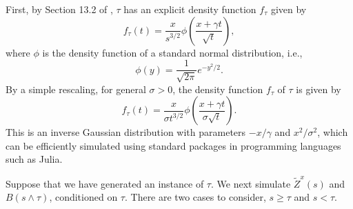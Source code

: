 \documentclass[11pt]{article}
\theoremstyle{definition}
\theoremstyle{plain}
\begin{document}
\begin{appendices}
First, by Section 13.2 of \cite{Steele2001}, $\tau$ has an explicit density function $f_\tau$ given by
\begin{equation}
f_\tau (t) = \frac{x}{s^{3/2}} \phi\left(\frac{x+\gamma t}{\sqrt{t}}\right),
\end{equation}
where $\phi$ is the density function of a standard normal distribution, i.e., 
\begin{equation}
\phi(y) = \frac{1}{\sqrt{2\pi}} e^{-y^2/2}.
\end{equation}
By a simple rescaling, for general $\sigma > 0$, the density function $f_\tau$ 
of $\tau$ is given by 
\begin{equation}
f_\tau (t) = \frac{x}{\sigma t^{3/2}} \phi\left(\frac{x+\gamma t}{\sigma\sqrt{t}}\right).
\end{equation}
This is an inverse Gaussian distribution with parameters $-x/\gamma$ and $x^2/\sigma^2$, 
which can be efficiently simulated using standard packages in programming languages such as Julia.

Suppose that we have generated an instance of $\tau$. 
We next simulate $\tilde Z^x(s)$ and $B(s\wedge \tau)$, conditioned on $\tau$. 
There are two cases to consider, $s\geq \tau$ and $s < \tau$.


\end{appendices}
\end{document}
